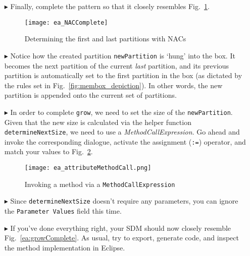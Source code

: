 \begin{itemize}
\item[$\blacktriangleright$] Finally, complete the pattern so that it closely resembles Fig.~\ref{ea:sdm_firstLastPartitions}. 

\begin{figure}[htbp]
\begin{center}
  \texttt{[image: ea\_NACComplete]} 
  \caption{Determining the first and last partitions with NACs}  
  \label{ea:sdm_firstLastPartitions}
\end{center}
\end{figure}
 
\item[$\blacktriangleright$] Notice how the created partition \texttt{newPartition} is `hung' into the box. It becomes the next partition of the current
\emph{last} partition, and its previous partition is automatically set to the first partition in the box (as dictated by the rules set in
Fig.~\ref{fig:membox_depiction}). In other words, the new partition is appended onto the current set of partitions.

\item[$\blacktriangleright$] In order to complete \texttt{grow}, we need to set the size of the \texttt{newPartition}. Given that the new size is calculated
via the helper function \texttt{det\-er\-mine\-Next\-Size}, we need to use a \emph{MethodCallExpression}. Go ahead and invoke the corresponding dialogue,
activate the assignment (\texttt{:=}) operator, and match your values to Fig.~\ref{ea:sdm_methodCallExpr}.
 
\begin{figure}[htbp]
\begin{center}
  \texttt{[image: ea\_attributeMethodCall.png]}
  \caption{Invoking a method via a \texttt{MethodCallExpression}}  
  \label{ea:sdm_methodCallExpr} 
\end{center}
\end{figure}

\item[$\blacktriangleright$] Since \texttt{determineNextSize} doesn't require any parameters, you can ignore the \texttt{Parameter Values} field this time. 

\vspace{0.5cm}

\item[$\blacktriangleright$] If you've done everything right, your SDM should now closely resemble Fig.~\ref{ea:growComplete}. As usual, try to export,
generate code, and inspect the method implementation in Eclipse.


\end{itemize}
